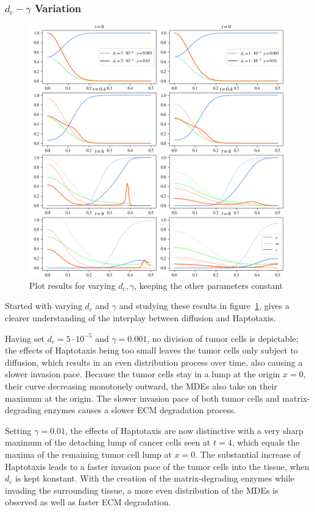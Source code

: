 \subsubsection*{$d_c - \gamma$ Variation}
\begin{figure}[h!]
 \centering
 \includegraphics[width=\textwidth]{resources/images/dc_gamma_variation.png}
 \caption{Plot results for varying $d_c, \gamma$, keeping the other parameters constant}
 \label{fig:dc_gamma_variation}
\end{figure}
Started with varying $d_c$ and $\gamma$ and studying these results in figure~\ref{fig:dc_gamma_variation}, gives a clearer understanding of the interplay between diffusion and Haptotaxis.

Having set $d_c=5\cdot 10^{-5}$ and $\gamma=0.001$, no division of tumor cells is depictable; the effects of Haptotaxis being too small leaves the tumor cells only subject to diffusion, which results in an even distribution process over time, also causing a slower invasion pace. Because the tumor cells stay in a lump at the origin $x=0$, their curve decreasing monotonely outward, the MDEs also take on their maximum at the origin. The slower invasion pace of both tumor cells and matrix-degrading enzymes causes a slower ECM degradation process. 

Setting $\gamma=0.01$, the effects of Haptotaxis are now distinctive with a very sharp maximum of the detaching lump of cancer cells seen at $t=4$, which equals the maxima of the remaining tumor cell lump at $x=0$. The substantial increase of Haptotaxis leads to a faster invasion pace of the tumor cells into the tissue, when $d_c$ is kept konstant. With the creation of the matrix-degrading enzymes while invading the surrounding tissue, a more even distribution of the MDEs is observed as well as faster ECM degradation. 

